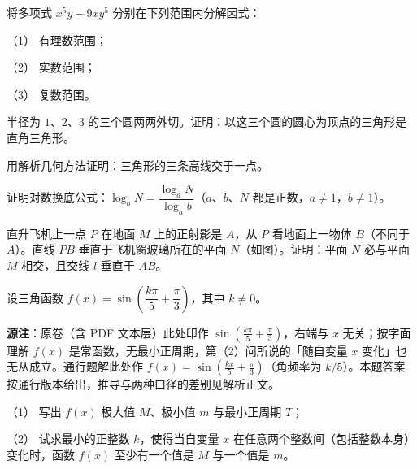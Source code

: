 \begin{question}
将多项式 $x^5y-9xy^5$ 分别在下列范围内分解因式：

（1） 有理数范围；

（2） 实数范围；

（3） 复数范围。

\end{question}
\begin{question}
半径为 $1$、$2$、$3$ 的三个圆两两外切。证明：以这三个圆的圆心为顶点的三角形是直角三角形。

\end{question}
\begin{question}
用解析几何方法证明：三角形的三条高线交于一点。

\end{question}
\begin{question}
证明对数换底公式：$\log_b N=\dfrac{\log_a N}{\log_a b}$（$a$、$b$、$N$ 都是正数，$a\neq1$，$b\neq1$）。

\Needspace{0.4\textheight}
\end{question}
\begin{question}
直升飞机上一点 $P$ 在地面 $M$ 上的正射影是 $A$，从 $P$ 看地面上一物体 $B$（不同于 $A$）。直线 $PB$ 垂直于飞机窗玻璃所在的平面 $N$（如图）。证明：平面 $N$ 必与平面 $M$ 相交，且交线 $l$ 垂直于 $AB$。
\nopagebreak[4]
\begin{center}\end{center}
\nopagebreak[4]
\end{question}
\begin{question}
设三角函数 $f(x)=\sin\left(\dfrac{k\pi}{5}+\dfrac{\pi}{3}\right)$，其中 $k\neq0$。

\begin{gktip}
\textbf{源注}：原卷（含 PDF 文本层）此处印作 $\sin\left(\frac{k\pi}{5}+\frac{\pi}{3}\right)$，右端与 $x$ 无关；按字面理解 $f(x)$ 是常函数，无最小正周期，第（2）问所说的「随自变量 $x$ 变化」也无从成立。通行题解此处作 $f(x)=\sin\left(\frac{kx}{5}+\frac{\pi}{3}\right)$（角频率为 $k/5$）。本题答案按通行版本给出，推导与两种口径的差别见解析正文。
\end{gktip}

（1） 写出 $f(x)$ 极大值 $M$、极小值 $m$ 与最小正周期 $T$；

（2） 试求最小的正整数 $k$，使得当自变量 $x$ 在任意两个整数间（包括整数本身）变化时，函数 $f(x)$ 至少有一个值是 $M$ 与一个值是 $m$。

\end{question}
